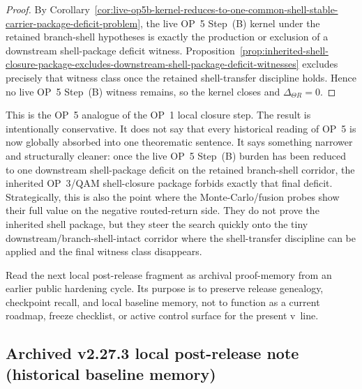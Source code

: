 \begin{proof}
By Corollary~\ref{cor:live-op5b-kernel-reduces-to-one-common-shell-stable-carrier-package-deficit-problem}, the live OP~5 Step~(B) kernel under the retained branch-shell hypotheses is exactly the production or exclusion of a downstream shell-package deficit witness. Proposition~\ref{prop:inherited-shell-closure-package-excludes-downstream-shell-package-deficit-witnesses} excludes precisely that witness class once the retained shell-transfer discipline holds. Hence no live OP~5 Step~(B) witness remains, so the kernel closes and \(\Delta_{\Theta R}=0\).
\end{proof}

\begin{remark}
\label{rem:what-sixth-op5b-sharpening-buys}
This is the OP~5 analogue of the OP~1 local closure step. The result is intentionally conservative. It does not say that every historical reading of OP~5 is now globally absorbed into one theorematic sentence. It says something narrower and structurally cleaner: once the live OP~5 Step~(B) burden has been reduced to one downstream shell-package deficit on the retained branch-shell corridor, the inherited OP~3/QAM shell-closure package forbids exactly that final deficit. Strategically, this is also the point where the Monte-Carlo/fusion probes show their full value on the negative routed-return side. They do not prove the inherited shell package, but they steer the search quickly onto the tiny downstream/branch-shell-intact corridor where the shell-transfer discipline can be applied and the final witness class disappears.
\end{remark}
\begin{remark}
Read the next local post-release fragment as archival proof-memory from an earlier public hardening cycle. Its purpose is to preserve release genealogy, checkpoint recall, and local baseline memory, not to function as a current roadmap, freeze checklist, or active control surface for the present v\docversion\ line.
\end{remark}

\subsection*{Archived v2.27.3 local post-release note (historical baseline memory)}




